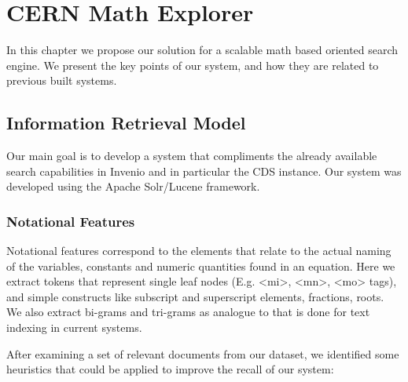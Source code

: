 \chapter{CERN Math Explorer}
\label{chapter-cern_math_explorer}
In this chapter we propose our solution for a scalable math based oriented search engine. We present the key points of our system, and how they are related to previous built systems.

\section{Information Retrieval Model}
Our main goal is to develop a system that compliments the already available search capabilities in Invenio and in particular the CDS instance. Our system was developed using the Apache Solr/Lucene framework.


\subsection{Notational Features}
Notational features correspond to the elements that relate to the actual naming of the variables, constants and numeric quantities found in an equation. Here we extract tokens that represent single leaf nodes (E.g. <mi>, <mn>, <mo> tags), and simple constructs like subscript and superscript elements, fractions, roots.
We also extract bi-grams and tri-grams as analogue to that is done for text indexing in current systems.

After examining a set of relevant documents from our dataset, we identified some heuristics that could be applied to improve the recall of our system:


